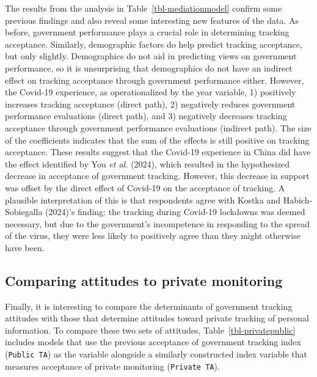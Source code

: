 \documentclass[
  letterpaper,
  DIV=11,
  numbers=noendperiod]{scrartcl}
\begin{document}
The results from the analysis in Table~\ref{tbl-mediationmodel} confirm
some previous findings and also reveal some interesting new features of
the data. As before, government performance plays a crucial role in
determining tracking acceptance. Similarly, demographic factors do help
predict tracking acceptance, but only slightly. Demographics do not aid
in predicting views on government performance, so it is unsurprising
that demographics do not have an indirect effect on tracking acceptance
through government performance either. However, the Covid-19 experience,
as operationalized by the year variable, 1) positively increases
tracking acceptance (direct path), 2) negatively reduces government
performance evaluations (direct path), and 3) negatively decreases
tracking acceptance through government performance evaluations (indirect
path). The size of the coefficients indicates that the sum of the
effects is still positive on tracking acceptance. These results suggest
that the Covid-19 experience in China did have the effect identified by
You \emph{et al.} (2024), which resulted in the hypothesized decrease in
acceptance of government tracking. However, this decrease in support was
offset by the direct effect of Covid-19 on the acceptance of tracking. A
plausible interpretation of this is that respondents agree with Kostka
and Habich-Sobiegalla (2024)'s finding: the tracking during Covid-19
lockdowns was deemed necessary, but due to the government's incompetence
in responding to the spread of the virus, they were less likely to
positively agree than they might otherwise have been.

\subsection{Comparing attitudes to private
monitoring}\label{comparing-attitudes-to-private-monitoring}

Finally, it is interesting to compare the determinants of government
tracking attitudes with those that determine attitudes toward private
tracking of personal information. To compare these two sets of
attitudes, Table~\ref{tbl-privatepublic} includes models that use the
previous acceptance of government tracking index (\texttt{Public\ TA})
as the variable alongside a similarly constructed index variable that
measures acceptance of private monitoring (\texttt{Private\ TA}).
\end{document}
